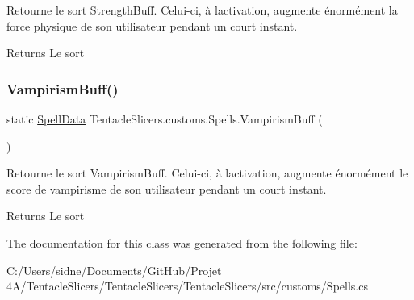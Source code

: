 Retourne le sort Strength\+Buff. Celui-\/ci, à l\textquotesingle{}activation, augmente énormément la force physique de son utilisateur pendant un court instant. 

\begin{DoxyReturn}{Returns}
Le sort 
\end{DoxyReturn}
\mbox{\label{class_tentacle_slicers_1_1customs_1_1_spells_a408ee32a021dc16ef9799804cfda39dc}} 
\subsubsection{\texorpdfstring{Vampirism\+Buff()}{VampirismBuff()}}
{\footnotesize\ttfamily static \hyperlink{class_tentacle_slicers_1_1spells_1_1_spell_data}{Spell\+Data} Tentacle\+Slicers.\+customs.\+Spells.\+Vampirism\+Buff (\begin{DoxyParamCaption}{ }\end{DoxyParamCaption})\hspace{0.3cm}{\ttfamily [static]}}



Retourne le sort Vampirism\+Buff. Celui-\/ci, à l\textquotesingle{}activation, augmente énormément le score de vampirisme de son utilisateur pendant un court instant. 

\begin{DoxyReturn}{Returns}
Le sort 
\end{DoxyReturn}


The documentation for this class was generated from the following file\+:\begin{DoxyCompactItemize}
\item 
C\+:/\+Users/sidne/\+Documents/\+Git\+Hub/\+Projet 4\+A/\+Tentacle\+Slicers/\+Tentacle\+Slicers/\+Tentacle\+Slicers/src/customs/Spells.\+cs\end{DoxyCompactItemize}
